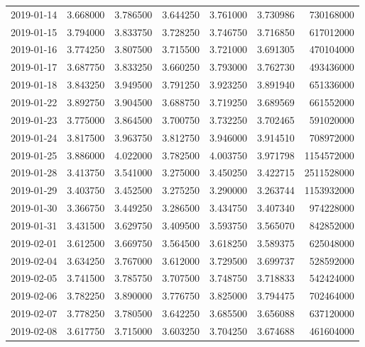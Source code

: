 \begin{tabular}{lrrrrrr}
2019-01-14 &    3.668000 &    3.786500 &    3.644250 &    3.761000 &    3.730986 &   730168000 \\
2019-01-15 &    3.794000 &    3.833750 &    3.728250 &    3.746750 &    3.716850 &   617012000 \\
2019-01-16 &    3.774250 &    3.807500 &    3.715500 &    3.721000 &    3.691305 &   470104000 \\
2019-01-17 &    3.687750 &    3.833250 &    3.660250 &    3.793000 &    3.762730 &   493436000 \\
2019-01-18 &    3.843250 &    3.949500 &    3.791250 &    3.923250 &    3.891940 &   651336000 \\
2019-01-22 &    3.892750 &    3.904500 &    3.688750 &    3.719250 &    3.689569 &   661552000 \\
2019-01-23 &    3.775000 &    3.864500 &    3.700750 &    3.732250 &    3.702465 &   591020000 \\
2019-01-24 &    3.817500 &    3.963750 &    3.812750 &    3.946000 &    3.914510 &   708972000 \\
2019-01-25 &    3.886000 &    4.022000 &    3.782500 &    4.003750 &    3.971798 &  1154572000 \\
2019-01-28 &    3.413750 &    3.541000 &    3.275000 &    3.450250 &    3.422715 &  2511528000 \\
2019-01-29 &    3.403750 &    3.452500 &    3.275250 &    3.290000 &    3.263744 &  1153932000 \\
2019-01-30 &    3.366750 &    3.449250 &    3.286500 &    3.434750 &    3.407340 &   974228000 \\
2019-01-31 &    3.431500 &    3.629750 &    3.409500 &    3.593750 &    3.565070 &   842852000 \\
2019-02-01 &    3.612500 &    3.669750 &    3.564500 &    3.618250 &    3.589375 &   625048000 \\
2019-02-04 &    3.634250 &    3.767000 &    3.612000 &    3.729500 &    3.699737 &   528592000 \\
2019-02-05 &    3.741500 &    3.785750 &    3.707500 &    3.748750 &    3.718833 &   542424000 \\
2019-02-06 &    3.782250 &    3.890000 &    3.776750 &    3.825000 &    3.794475 &   702464000 \\
2019-02-07 &    3.778250 &    3.780500 &    3.642250 &    3.685500 &    3.656088 &   637120000 \\
2019-02-08 &    3.617750 &    3.715000 &    3.603250 &    3.704250 &    3.674688 &   461604000 \\

\end{tabular}

